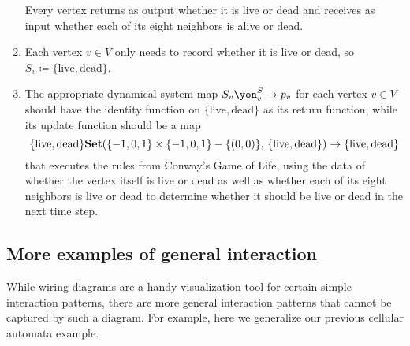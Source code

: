 \documentclass[Book-Poly]{subfiles}
\begin{document}
\begin{exercise}
\begin{solution}
\begin{enumerate}
\[    \]
    Every vertex returns as output whether it is live or dead and receives as input whether each of its eight neighbors is alive or dead. 
    \item Each vertex $v\in V$ only needs to record whether it is live or dead, so $S_v\coloneqq\{\text{live},\text{dead}\}$.
    \item The appropriate dynamical system map $S_v\yon^S_v\to p_v$ for each vertex $v\in V$ should have the identity function on $\{\text{live},\text{dead}\}$ as its return function, while its update function should be a map
    \[
        \{\text{live},\text{dead}\}\mathbf{Set}(\{-1,0,1\}\times\{-1,0,1\}-\{(0,0)\},\, \{\text{live},\text{dead}\})\to\{\text{live},\text{dead}\}
    \]
    that executes the rules from Conway's Game of Life, using the data of whether the vertex itself is live or dead as well as whether each of its eight neighbors is live or dead to determine whether it should be live or dead in the next time step.
\end{enumerate}
\end{solution}
\end{exercise}

\subsection{More examples of general interaction}

While wiring diagrams are a handy visualization tool for certain simple interaction patterns, there are more general interaction patterns that cannot be captured by such a diagram.
For example, here we generalize our previous cellular automata example.
\end{document}
